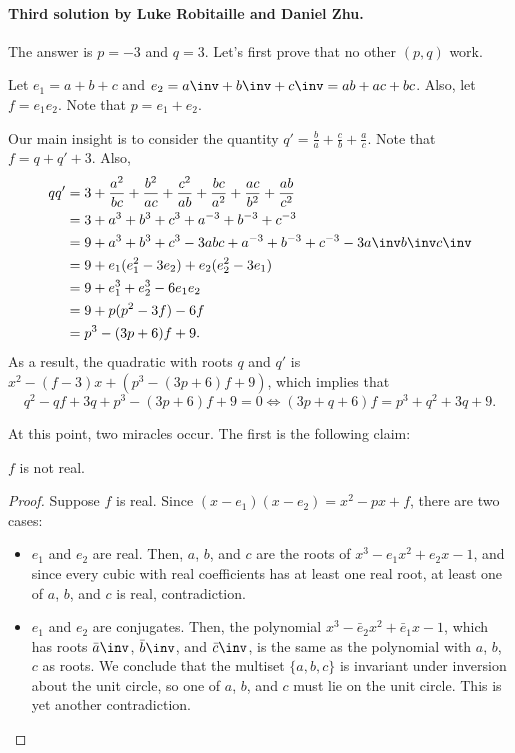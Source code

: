 \documentclass[11pt]{scrartcl}
\begin{document}
\paragraph{Third solution by Luke Robitaille and Daniel Zhu.}
The answer is $p = -3$ and $q = 3$.
Let's first prove that no other $(p, q)$ work.

Let $e_1 = a + b + c$ and $e_2 = a\inv + b\inv + c\inv = ab + ac + bc$.
Also, let $f = e_1e_2$. Note that $p = e_1 + e_2$.

Our main insight is to consider the quantity
$q' = \frac{b}{a} + \frac{c}{b} + \frac{a}{c}$.
Note that $f = q + q' + 3$. Also,
\begin{align*}
  qq' &= 3 + \frac{a^2}{bc} + \frac{b^2}{ac} + \frac{c^2}{ab}
    + \frac{bc}{a^2} + \frac{ac}{b^2} + \frac{ab}{c^2} \\
  &= 3 + a^3 + b^3 + c^3 + a^{-3} + b^{-3} + c^{-3} \\
  &= 9 + a^3 + b^3 + c^3 - 3abc + a^{-3} + b^{-3} + c^{-3} - 3a\inv b\inv c\inv \\
  &= 9 + e_1(e_1^2 - 3e_2) + e_2(e_2^2 - 3e_1) \\
  &= 9 + e_1^3 + e_2^3 - 6e_1e_2 \\
  &= 9 + p(p^2 - 3f) - 6f \\
  &= p^3 - (3p + 6)f + 9.
  \end{align*}
As a result, the quadratic with roots $q$ and $q'$ is
$x^2 - (f - 3)x + (p^3 - (3p+6) f + 9)$, which implies that
\[ q^2 - qf + 3q + p^3 - (3p + 6)f + 9 = 0
  \iff (3p + q + 6)f = p^3 + q^2 + 3q + 9. \]

At this point, two miracles occur.
The first is the following claim:
\begin{claim*}
  $f$ is not real.
\end{claim*}
\begin{proof}
  Suppose $f$ is real. Since $(x - e_1)(x - e_2) = x^2 - px + f$, there are two cases:
  \begin{itemize}
  \item $e_1$ and $e_2$ are real.
    Then, $a$, $b$, and $c$ are the roots of $x^3 - e_1 x^2 + e_2 x - 1$,
    and since every cubic with real coefficients has at least one real root,
    at least one of $a$, $b$, and $c$ is real, contradiction.
  \item $e_1$ and $e_2$ are conjugates.
    Then, the polynomial $x^3 - \bar e_2 x^2 + \bar e_1 x - 1$,
    which has roots $\bar a\inv$, $\bar b \inv$, and $\bar c \inv$,
    is the same as the polynomial with $a$, $b$, $c$ as roots.
    We conclude that the multiset $\{a, b, c\}$ is invariant
    under inversion about the unit circle,
    so one of $a$, $b$, and $c$ must lie on the unit circle.
    This is yet another contradiction. \qedhere
  \end{itemize}
\end{proof}
\end{document}
